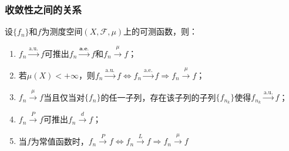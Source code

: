 \subsubsection{收敛性之间的关系}
\begin{theorem}\label{theo:a.e.a.u.mu.d}
	设$\{f_n\}$和$f$为测度空间$(X,\mathscr{F},\mu)$上的可测函数，则：
	\begin{enumerate}
		\item $f_n\overset{\text{a.u.}}{\longrightarrow}f$可推出$f_n\overset{\textbf{a.e.}}{\longrightarrow}f$和$f_n\overset{\mu}{\longrightarrow}f$；
		\item 若$\mu(X)<+\infty$，则$f_n\overset{\text{a.u.}}{\longrightarrow}f\iff f_n\overset{\text{a.e.}}{\longrightarrow}f\Rightarrow f_n\overset{\mu}{\longrightarrow}f$；
		\item $f_n\overset{\mu}{\longrightarrow}f$当且仅当对$\{f_n\}$的任一子列，存在该子列的子列$\{f_{n_k}\}$使得$f_{n_k}\overset{\text{a.u.}}{\longrightarrow}f$；
		\item $f_n\overset{P}{\longrightarrow}f$可推出$f_n\overset{d}{\longrightarrow}f$；
		\item 当$f$为常值函数时，$f_n\overset{P}{\longrightarrow}f\iff f_n\overset{L}{\longrightarrow}f\Rightarrow f_n\overset{\mu}{\longrightarrow}f$
	\end{enumerate}
\end{theorem}
